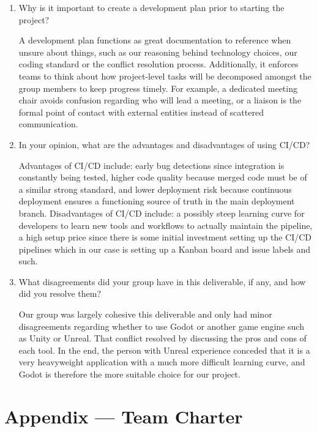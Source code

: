 \documentclass{article}
\begin{document}
\begin{enumerate}
    \item Why is it important to create a development plan prior to starting the
    project?

    A development plan functions as great documentation to reference when unsure about things, such as our reasoning behind technology choices, our coding standard or the conflict resolution process. Additionally, it enforces teams to think about how project-level tasks will be decomposed amongst the group members to keep progress timely. For example, a dedicated meeting chair avoids confusion regarding who will lead a meeting, or a liaison is the formal point of contact with external entities instead of scattered communication.

    \item In your opinion, what are the advantages and disadvantages of using
    CI/CD?

    Advantages of CI/CD include: early bug detections since integration is constantly being tested, higher code quality because merged code must be of a similar strong standard, and lower deployment risk because continuous deployment ensures a functioning source of truth in the main deployment branch. 
    Disadvantages of CI/CD include: a possibly steep learning curve for developers to learn new tools and workflows to actually maintain the pipeline, a high setup price since there is some initial investment setting up the CI/CD pipelines which in our case is setting up a Kanban board and issue labels and such. 

    \item What disagreements did your group have in this deliverable, if any,
    and how did you resolve them?

    Our group was largely cohesive this deliverable and only had minor disagreements regarding whether to use Godot or another game engine such as Unity or Unreal. That conflict resolved by discussing the pros and cons of each tool. In the end, the person with Unreal experience conceded that it is a very heavyweight application with a much more difficult learning curve, and Godot is therefore the more suitable choice for our project.


\end{enumerate}

\newpage{}

\section*{Appendix --- Team Charter}
\end{document}
